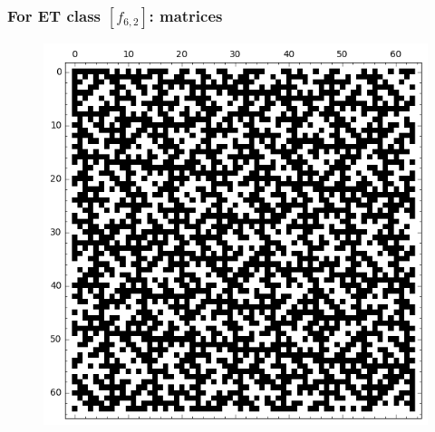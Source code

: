 \documentclass[pdf,sprung,slideColor,nocolorBG]{beamer}
\begin{document}
% 
\begin{frame}
\frametitle{For ET class $[f_{6,2}]$: matrices}
\begin{figure}
\centering
\begin{minipage}{.48\textwidth}
  \centering
  \includegraphics[width=.9\linewidth]{../matrix_plot/c6_2_weight_class_matrix.png}
  \label{fig:6_2_weight_class_matrix}
\end{minipage}%
\begin{minipage}{.48\textwidth}
  \centering

\end{minipage}
\end{figure}
\end{frame}
\end{document}
